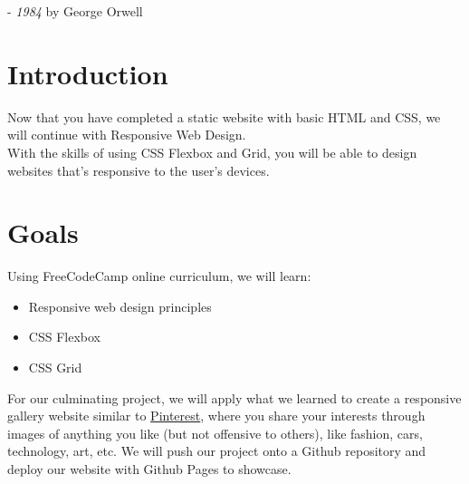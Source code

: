 \documentclass{42-en}
\begin{document}
- \textit{1984} by George Orwell
    
\chapter{Introduction}

Now that you have completed a static website with basic HTML and CSS, we will continue with Responsive Web Design. \\


With the skills of using CSS Flexbox and Grid, you will be able to design websites that's responsive to the user's devices.



\chapter{Goals}

Using FreeCodeCamp online curriculum, we will learn:
\begin{itemize}
    \item Responsive web design principles
    \item CSS Flexbox
    \item CSS Grid
\end{itemize}

For our culminating project, we will apply what we learned to create a responsive gallery website similar to \href{https://www.pinterest.com/}{Pinterest}, where you share your interests through images of anything you like (but not offensive to others), like fashion, cars, technology, art, etc. We will push our project onto a Github repository and deploy our website with Github Pages to showcase.
\end{document}
